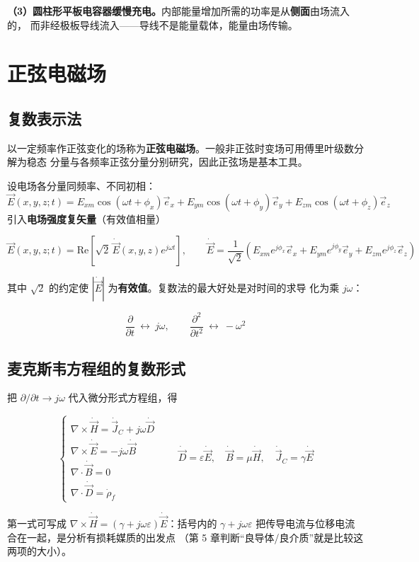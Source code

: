 \textbf{（3）圆柱形平板电容器缓慢充电。}内部能量增加所需的功率是从\textbf{侧面}由场流入的，
而非经极板导线流入——导线不是能量载体，能量由场传输。


\section{正弦电磁场}

\subsection{复数表示法}

以一定频率作正弦变化的场称为\textbf{正弦电磁场}。一般非正弦时变场可用傅里叶级数分解为稳态
分量与各频率正弦分量分别研究，因此正弦场是基本工具。

设电场各分量同频率、不同初相：
\[
\vec{E}(x,y,z;t)=E_{xm}\cos(\omega t+\phi_x)\vec{e}_x
+E_{ym}\cos(\omega t+\phi_y)\vec{e}_y
+E_{zm}\cos(\omega t+\phi_z)\vec{e}_z
\]
引入\textbf{电场强度复矢量}（有效值相量）
\begin{formulaBox}
\[
\vec{E}(x,y,z;t)=\mathrm{Re}\left[\sqrt{2}\,\dot{\vec{E}}(x,y,z)e^{j\omega t}\right],
\qquad
\dot{\vec{E}}=\frac{1}{\sqrt{2}}\left(E_{xm}e^{j\phi_x}\vec{e}_x
+E_{ym}e^{j\phi_y}\vec{e}_y+E_{zm}e^{j\phi_z}\vec{e}_z\right)
\]
\end{formulaBox}
其中 $\sqrt{2}$ 的约定使 $|\dot{\vec{E}}|$ 为\textbf{有效值}。复数法的最大好处是对时间的求导
化为乘 $j\omega$：
\begin{formulaBox}
\[
\frac{\partial}{\partial t}\ \longleftrightarrow\ j\omega,
\qquad
\frac{\partial^2}{\partial t^2}\ \longleftrightarrow\ -\omega^{2}
\]
\end{formulaBox}

\subsection{麦克斯韦方程组的复数形式}

把 $\partial/\partial t\to j\omega$ 代入微分形式方程组，得
\begin{formulaBox}
\[
\begin{cases}
\nabla\times\dot{\vec{H}}=\dot{\vec{J}}_C+j\omega\dot{\vec{D}}\\[6pt]
\nabla\times\dot{\vec{E}}=-j\omega\dot{\vec{B}}\\[6pt]
\nabla\cdot\dot{\vec{B}}=0\\[6pt]
\nabla\cdot\dot{\vec{D}}=\dot{\rho}_f
\end{cases}
\qquad
\dot{\vec{D}}=\varepsilon\dot{\vec{E}},\quad
\dot{\vec{B}}=\mu\dot{\vec{H}},\quad
\dot{\vec{J}}_C=\gamma\dot{\vec{E}}
\]
\end{formulaBox}
第一式可写成
$\nabla\times\dot{\vec{H}}=(\gamma+j\omega\varepsilon)\dot{\vec{E}}$：括号内的
$\gamma+j\omega\varepsilon$ 把传导电流与位移电流合在一起，是分析有损耗媒质的出发点
（第 5 章判断“良导体/良介质”就是比较这两项的大小）。


